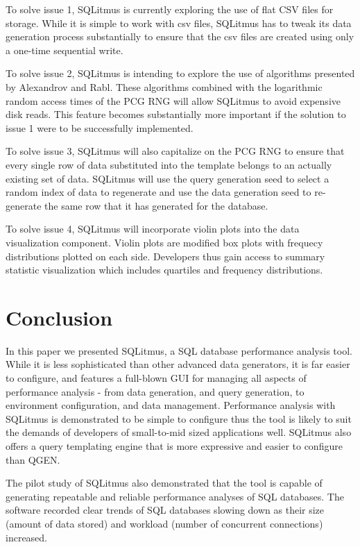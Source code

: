 \documentclass[12pt]{report}
\begin{document}
\begin{spacing}{1.9}
	To solve issue 1, SQLitmus is currently exploring the use of flat CSV files for storage. While it is simple to work with csv files, SQLitmus has to tweak its data generation process substantially to ensure that the csv files are created using only a one-time sequential write.
	
	To solve issue 2, SQLitmus is intending to explore the use of algorithms presented by Alexandrov\cite{Alexandrov:2012} and Rabl\cite{Rabl:2013}. These algorithms combined with the logarithmic random access times of the PCG RNG will allow SQLitmus to avoid expensive disk reads. This feature becomes substantially more important if the solution to issue 1 were to be successfully implemented.
	
	To solve issue 3, SQLitmus will also capitalize on the PCG RNG to ensure that every single row of data substituted into the template belongs to an actually existing set of data. SQLitmus will use the query generation seed to select a random index of data to regenerate and use the data generation seed to re-generate the same row that it has generated for the database.
	
	To solve issue 4, SQLitmus will incorporate violin plots into the data visualization component. Violin plots are modified box plots with frequecy distributions plotted on each side. Developers thus gain access to summary statistic visualization which includes quartiles and frequency distributions.
	
	\section{Conclusion}
	
	In this paper we presented SQLitmus, a SQL database performance analysis tool. While it is less sophisticated than other advanced data generators, it is far easier to configure, and features a full-blown GUI for managing all aspects of performance analysis - from data generation, and query generation, to environment configuration, and data management. Performance analysis with SQLitmus is demonstrated to be simple to configure thus the tool is likely to suit the demands of developers of small-to-mid sized applications well. SQLitmus also offers a query templating engine that is more expressive and easier to configure than QGEN\cite{Poess:2004}.
	
	The pilot study of SQLitmus also demonstrated that the tool is capable of generating repeatable and reliable performance analyses of SQL databases. The software recorded clear trends of SQL databases slowing down as their size (amount of data stored) and workload (number of concurrent connections) increased.
	

\end{spacing}
\end{document}
